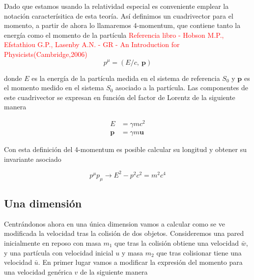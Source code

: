 \vspace{3mm}

Dado que estamos usando la relatividad especial es conveniente emplear la notación caracterísitica de esta teoría. Así definimos un cuadrivector para el momento, a partir de ahora lo llamaremos 4-momentum, que contiene tanto la energía como el momento de la partícula \cite{RelatividadBook}
\textcolor{red}{Referencia libro - Hobson M.P., Efstathiou G.P., Lasenby A.N. - GR - An Introduction for Physicists(Cambridge,2006) }
\begin{equation}\label{eq:4-momentum}
    p^\mu = (E/c, \: \mathbf{p})
\end{equation}

donde \( E \) es la energía de la partícula medida en el sistema de referencia \( S_0 \) y \( \mathbf{p} \) es el momento medido en el sistema \( S_0 \) asociado a la partícula. Las componentes de este cuadrivector se expresan en función del factor de Lorentz de la siguiente manera

\begin{align}
    E &= \gamma m c^2 \\
    \mathbf{p} &= \gamma m \mathbf{u}
\end{align}

Con esta definición del 4-momentum es posible calcular su longitud y obtener su invariante asociado

\begin{equation}\label{eq:invariamente_momento_energia}
    p^\mu p_\mu \longrightarrow E^2 - p^2 c^2 = m^2c^4
\end{equation}

\vspace{3mm}

\subsection{Una dimensión}

Centrándonos ahora en una única dimension vamos a calcular como se ve modificada la velocidad tras la colisión de dos objetos. Consideremos una pared inicialmente en reposo con masa \( m_1 \) que tras la colisión obtiene una velocidad \( \bar{w} \), y una partícula con velocidad inicial \( u \) y masa \( m _2 \) que tras colisionar tiene una velocidad \( \bar{u} \). En primer lugar vamos a modificar la expresión del momento para una velocidad genérica \( v \) de la siguiente manera

